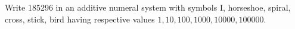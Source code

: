 Write 185296 in an additive numeral system with symbols I, horseshoe, spiral, cross, stick, bird having respective values $1,10,100,1000,10000,100000$.
